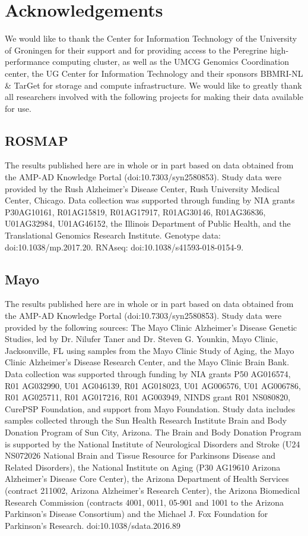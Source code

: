 {{\section*{Acknowledgements}
We would like to thank the Center for Information Technology of the University of Groningen for their support and for providing access to the Peregrine high-performance computing cluster, as well as the UMCG Genomics Coordination center, the UG Center for Information Technology and their sponsors BBMRI-NL \& TarGet for storage and compute infrastructure. We would like to greatly thank all researchers involved with the following projects for making their data available for use. 

\subsection{ROSMAP}

The results published here are in whole or in part based on data obtained from the AMP-AD Knowledge Portal (doi:10.7303/syn2580853). Study data were provided by the Rush Alzheimer’s Disease Center, Rush University Medical Center, Chicago. Data collection was supported through funding by NIA grants P30AG10161, R01AG15819, R01AG17917, R01AG30146, R01AG36836, U01AG32984, U01AG46152, the Illinois Department of Public Health, and the Translational Genomics Research Institute. 
Genotype data: doi:10.1038/mp.2017.20. RNAseq: doi:10.1038/s41593-018-0154-9.  

\subsection{Mayo}

The results published here are in whole or in part based on data obtained from the AMP-AD Knowledge Portal (doi:10.7303/syn2580853). Study data were provided by the following sources: The Mayo Clinic Alzheimer’s Disease Genetic Studies, led by Dr. Nilufer Taner and Dr. Steven G. Younkin, Mayo Clinic, Jacksonville, FL using samples from the Mayo Clinic Study of Aging, the Mayo Clinic Alzheimer’s Disease Research Center, and the Mayo Clinic Brain Bank. Data collection was supported through funding by NIA grants P50 AG016574, R01 AG032990, U01 AG046139, R01 AG018023, U01 AG006576, U01 AG006786, R01 AG025711, R01 AG017216, R01 AG003949, NINDS grant R01 NS080820, CurePSP Foundation, and support from Mayo Foundation. Study data includes samples collected through the Sun Health Research Institute Brain and Body Donation Program of Sun City, Arizona. The Brain and Body Donation Program is supported by the National Institute of Neurological Disorders and Stroke (U24 NS072026 National Brain and Tissue Resource for Parkinsons Disease and Related Disorders), the National Institute on Aging (P30 AG19610 Arizona Alzheimer’s Disease Core Center), the Arizona Department of Health Services (contract 211002, Arizona Alzheimer’s Research Center), the Arizona Biomedical Research Commission (contracts 4001, 0011, 05-901 and 1001 to the Arizona Parkinson's Disease Consortium) and the Michael J. Fox Foundation for Parkinson’s Research.  doi:10.1038/sdata.2016.89 


}}
